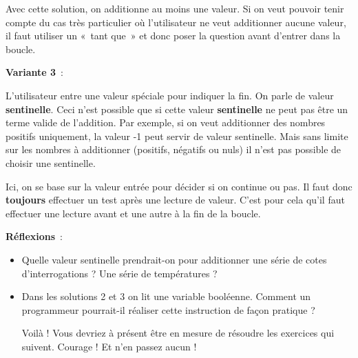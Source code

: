 		Avec cette solution, on additionne au moins une valeur. 
		Si on veut pouvoir tenir compte du
		cas très particulier où l'utilisateur ne veut
		additionner aucune valeur, il faut utiliser un «~tant que~» et donc
		poser la question avant d'entrer dans la boucle.


		\textbf{Variante 3}~:
		
		L'utilisateur entre une valeur spéciale pour indiquer la fin. 
		On parle de valeur \textbf{sentinelle}. 
		Ceci n'est possible que si cette valeur \textbf{sentinelle} ne peut pas être
		un terme valide de l'addition. Par exemple, si on veut
		additionner des nombres positifs uniquement, la valeur -1 peut servir
		de valeur sentinelle. Mais sans limite sur les nombres à additionner
		(positifs, négatifs ou nuls) il n'est pas possible de
		choisir une sentinelle.

		Ici, on se base sur la valeur entrée pour décider si on continue ou pas. 
		Il faut donc \textbf{toujours} effectuer un test
		après une lecture de valeur. C'est pour cela
		qu'il faut effectuer une lecture avant et une autre à
		la fin de la boucle.


		\textbf{Réflexions}~: 
		\begin{itemize}
		\item
		Quelle valeur sentinelle prendrait-on 
		pour additionner une série de cotes d'interrogations ? 
		Une série de températures ?

		\item
		Dans les solutions 2 et 3 on lit une variable booléenne. 
		Comment un programmeur pourrait-il réaliser 
		cette instruction de façon pratique ?
		
		Voilà ! Vous devriez à présent être en mesure de
		résoudre les exercices qui suivent.
		Courage ! Et n'en passez aucun !
		\end{itemize}
		

